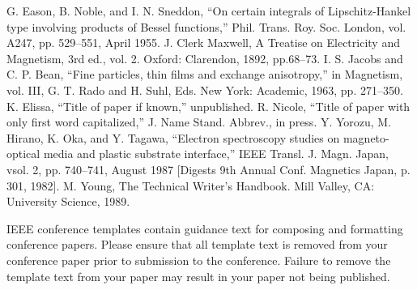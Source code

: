 \documentclass[conference]{IEEEtran}
\begin{document}
\begin{thebibliography}{00}
 G. Eason, B. Noble, and I. N. Sneddon, ``On certain integrals of Lipschitz-Hankel type involving products of Bessel functions,'' Phil. Trans. Roy. Soc. London, vol. A247, pp. 529--551, April 1955.
 J. Clerk Maxwell, A Treatise on Electricity and Magnetism, 3rd ed., vol. 2. Oxford: Clarendon, 1892, pp.68--73.
 I. S. Jacobs and C. P. Bean, ``Fine particles, thin films and exchange anisotropy,'' in Magnetism, vol. III, G. T. Rado and H. Suhl, Eds. New York: Academic, 1963, pp. 271--350.
 K. Elissa, ``Title of paper if known,'' unpublished.
 R. Nicole, ``Title of paper with only first word capitalized,'' J. Name Stand. Abbrev., in press.
 Y. Yorozu, M. Hirano, K. Oka, and Y. Tagawa, ``Electron spectroscopy studies on magneto-optical media and plastic substrate interface,'' IEEE Transl. J. Magn. Japan, vsol. 2, pp. 740--741, August 1987 [Digests 9th Annual Conf. Magnetics Japan, p. 301, 1982].
 M. Young, The Technical Writer's Handbook. Mill Valley, CA: University Science, 1989.
\end{thebibliography}
\vspace{12pt}
\color{red}
IEEE conference templates contain guidance text for composing and formatting conference papers. Please ensure that all template text is removed from your conference paper prior to submission to the conference. Failure to remove the template text from your paper may result in your paper not being published.
\end{document}
